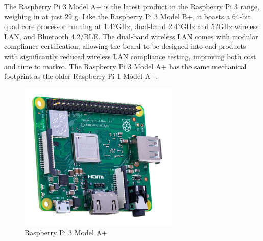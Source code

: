 \par The Raspberry Pi 3 Model A+ is the latest product in the Raspberry Pi 3 range, weighing in at just 29 g. Like the Raspberry Pi 3 Model B+, it boasts a 64-bit quad core processor running at 1.4?GHz, dual-band 2.4?GHz and 5?GHz wireless LAN, and Bluetooth 4.2/BLE. The dual-band wireless LAN comes with modular compliance certification, allowing the board to be designed into end products with significantly reduced wireless LAN compliance testing, improving both cost and time to market. The Raspberry Pi 3 Model A+ has the same mechanical footprint as the older Raspberry Pi 1 Model A+.
	\begin{figure}[h]
		\centering
		\includegraphics[width=3in]{rasPi.png}
		\caption{Raspberry Pi 3 Model A+}
	\end{figure}
